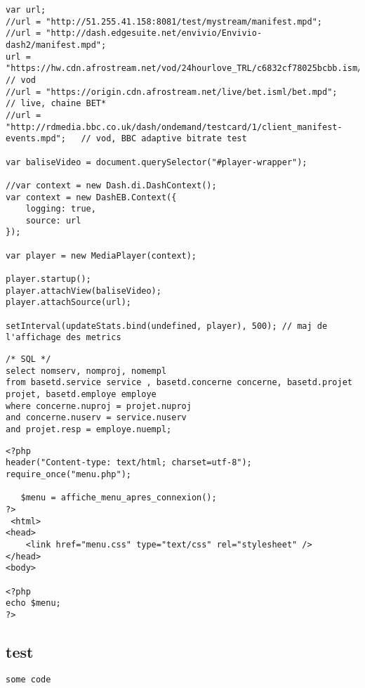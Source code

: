 \begin{verbatim}
var url;
//url = "http://51.255.41.158:8081/test/mystream/manifest.mpd"; 
//url = "http://dash.edgesuite.net/envivio/Envivio-dash2/manifest.mpd";
url = "https://hw.cdn.afrostream.net/vod/24hourlove_TRL/c6832cf78025bcbb.ism/c6832cf78025bcbb.mpd"; // vod 
//url = "https://origin.cdn.afrostream.net/live/bet.isml/bet.mpd";    // live, chaine BET*
//url = "http://rdmedia.bbc.co.uk/dash/ondemand/testcard/1/client_manifest-events.mpd";   // vod, BBC adaptive bitrate test 

var baliseVideo = document.querySelector("#player-wrapper");

//var context = new Dash.di.DashContext();
var context = new DashEB.Context({
	logging: true,
	source: url
});

var player = new MediaPlayer(context);

player.startup();
player.attachView(baliseVideo);
player.attachSource(url);

setInterval(updateStats.bind(undefined, player), 500); // maj de l'affichage des metrics
\end{verbatim}


\begin{verbatim}
/* SQL */
select nomserv, nomproj, nomempl
from basetd.service service , basetd.concerne concerne, basetd.projet projet, basetd.employe employe
where concerne.nuproj = projet.nuproj
and concerne.nuserv = service.nuserv
and projet.resp = employe.nuempl;
\end{verbatim}


\begin{verbatim}
<?php
header("Content-type: text/html; charset=utf-8");
require_once("menu.php");

   $menu = affiche_menu_apres_connexion();
?>
 <html>
<head>
    <link href="menu.css" type="text/css" rel="stylesheet" /> 
</head>
<body>    
  
<?php
echo $menu;
?>
\end{verbatim}



\subsection{test}


\begin{lstlisting}[language=xml, frame=single, caption={"Segment of the XML input file"}, label={lst:xmlfile}]
    some code
\end{lstlisting}


